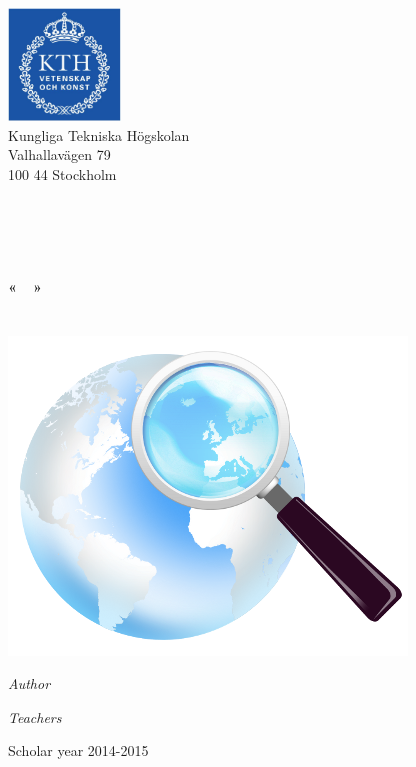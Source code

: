 \begin{center}
	\begin{minipage}[t]{0.48\textwidth}
	  \begin{flushleft}
	    \includegraphics [width=30mm]{img/logo_kth.jpg} \\[0.1cm]
		Kungliga Tekniska Högskolan\\
		Valhallavägen 79\\
		100 44 Stockholm
	  \end{flushleft}
	\end{minipage}
	\begin{minipage}[t]{0.48\textwidth}
	  \begin{flushright}
	  \end{flushright}
	\end{minipage} \\[1cm]

	\textsc{\Large \reportsubject}\\[0.3cm]
	\HRule \\[0.4cm]
	{\Huge \bfseries \reporttitle}\\[0.3cm]
	{\LARGE \bfseries «~\stagetopic~»}\\[0.3cm]
	{\Large \dateperiod}\\[0.4cm]
	\HRule \\[1.5cm]

	\includegraphics [width=0.45\linewidth]{img/icon.png} \\[1.5cm]
	\begin{minipage}[t]{0.5\textwidth}
	  \begin{flushleft} \large
	    \emph{Author}\\
	    \reportauthor
	  \end{flushleft}
	\end{minipage}
	\begin{minipage}[t]{0.4\textwidth}
	  \begin{flushright} \large
	    \emph{Teachers} \\
	    \enseignants
	  \end{flushright}
	\end{minipage}

	\vfill
	\footnotesize{Scholar year 2014-2015}
\end{center}

